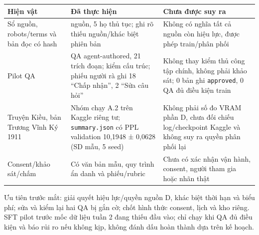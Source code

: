 \documentclass[11pt,a4paper]{article}
\begin{document}
{\def\LTcaptype{none} %
\begin{longtable}[]{@{}
  >{\raggedright\arraybackslash}p{}
  >{\raggedright\arraybackslash}p{}
  >{\raggedright\arraybackslash}p{}@{}}
\toprule\noalign{}
\begin{minipage}[b]{\linewidth}\raggedright
Hiện vật
\end{minipage} & \begin{minipage}[b]{\linewidth}\raggedright
Đã thực hiện
\end{minipage} & \begin{minipage}[b]{\linewidth}\raggedright
Chưa được suy ra
\end{minipage} \\
\midrule\noalign{}
\endhead
\bottomrule\noalign{}
\endlastfoot
Sổ nguồn, robots/terms và bản đọc có hash & 9 nguồn, 5 họ thủ tục; ghi
rõ thiếu nguồn/khác biệt phiên bản & Không có nghĩa tất cả nguồn còn
hiệu lực, được phép train/phân phối \\
Pilot QA & 20 QA agent-authored, 21 trích đoạn; kiểm cấu trúc; phiếu
người rà ghi 18 ``Chấp nhận'', 2 ``Sửa câu hỏi'' & Không thay kiểm thủ
công tập chính, không phải khảo sát; 0 bản ghi \nolinkurl{approved}, 0
QA đủ điều kiện train \\
Truyện Kiều, bản Trương Vĩnh Ký 1911 & Nhóm chạy A.2 trên Kaggle riêng
tư; \nolinkurl{summary.json} có PPL validation 10,1948 ± 0,0628 (SD mẫu,
5 seed) & Không phải số đo VRAM phần D, chưa đối chiếu log/checkpoint
Kaggle và không suy ra quyền phân phối lại \\
Consent/khảo sát/chấm & Có văn bản mẫu, quy trình ẩn danh và
phiếu/rubric & Chưa có xác nhận vận hành, consent, người tham gia hoặc
nhãn thật \\
\end{longtable}
}

Ưu tiên trước mắt: giải quyết hiệu lực/quyền nguồn D, khác biệt thời hạn
và biểu phí; sửa và kiểm lại hai QA bị gắn cờ; chốt hình thức consent,
lịch và kho riêng. SFT pilot trước mốc dữ liệu tuần 2 đang thiếu đầu
vào; chỉ chạy khi QA đủ điều kiện và báo rủi ro nếu không kịp, không
đánh dấu hoàn thành dựa trên kế hoạch.
\end{document}
